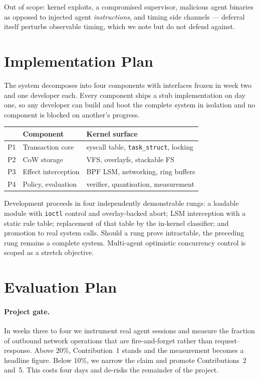 \documentclass[10pt,twocolumn]{article}
\begin{document}
Out of scope: kernel exploits, a compromised supervisor, malicious agent
binaries as opposed to injected agent \emph{instructions}, and timing side
channels --- deferral itself perturbs observable timing, which we note but do
not defend against.

\section{Implementation Plan}

The system decomposes into four components with interfaces frozen in week two
and one developer each. Every component ships a stub implementation on day one,
so any developer can build and boot the complete system in isolation and no
component is blocked on another's progress.

\begin{center}
\small
\begin{tabular}{@{}llp{2.4cm}@{}}
\toprule
& \textbf{Component} & \textbf{Kernel surface}\\
\midrule
P1 & Transaction core & syscall table,
                        \texttt{task\_struct}, locking\\
P2 & CoW storage & VFS, overlayfs, stackable FS\\
P3 & Effect interception & BPF LSM, networking, ring buffers\\
P4 & Policy, evaluation & verifier, quantisation, measurement\\
\bottomrule
\end{tabular}
\end{center}

Development proceeds in four independently demonstrable rungs: a loadable module
with \texttt{ioctl} control and overlay-backed abort; LSM interception with a
static rule table; replacement of that table by the in-kernel classifier; and
promotion to real system calls. Should a rung prove intractable, the preceding
rung remains a complete system. Multi-agent optimistic concurrency control is
scoped as a stretch objective.

\section{Evaluation Plan}
\label{sec:eval}

\paragraph{Project gate.} In weeks three to four we instrument real agent
sessions and measure the fraction of outbound network operations that are
fire-and-forget rather than request--response. Above 20\%, Contribution~1 stands
and the measurement becomes a headline figure. Below 10\%, we narrow the claim
and promote Contributions~2 and~5. This costs four days and de-risks the
remainder of the project.
\end{document}
